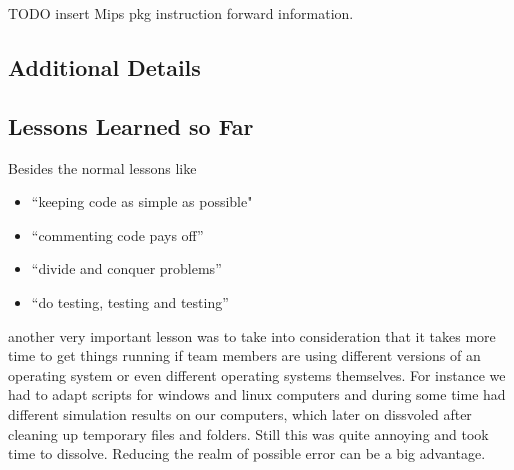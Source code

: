 TODO insert Mips pkg instruction forward information.




\subsection{Additional Details}

\subsection{Lessons Learned so Far}
Besides the normal lessons like 

\begin{itemize}
\item ``keeping code as simple as possible"
\item ``commenting code pays off''
\item ``divide and conquer problems''
\item ``do testing, testing and testing''
\end{itemize}

another very important lesson was to take into consideration that it takes more time to get things running if team members are using different versions of an operating system or even different operating systems themselves. For instance we had to adapt scripts for windows and linux computers and during some time had different simulation results on our computers, which later on dissvoled after cleaning up temporary files and folders. Still this was quite annoying and took time to dissolve. Reducing the realm of possible error can be a big advantage.


